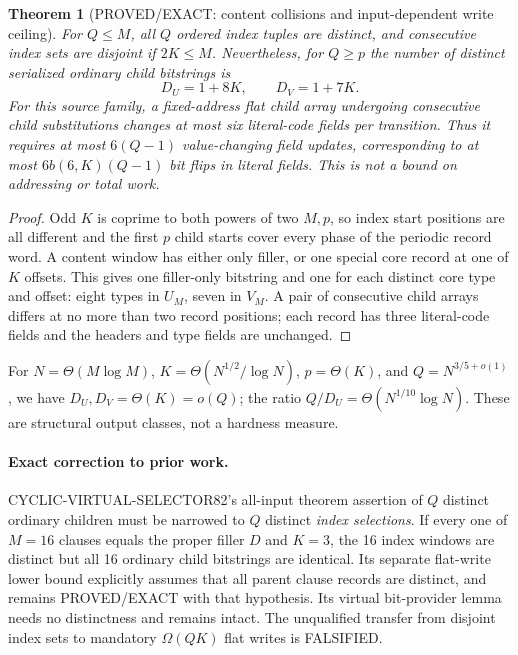 \documentclass[11pt]{article}
\newtheorem{theorem}{Theorem}
\begin{document}
\begin{theorem}[PROVED/EXACT: content collisions and input-dependent write ceiling]
For \(Q\le M\), all \(Q\) ordered index tuples are distinct, and consecutive index sets are disjoint if \(2K\le M\). Nevertheless, for \(Q\ge p\) the number of distinct \emph{serialized ordinary child bitstrings} is
\[
D_U=1+8K,\qquad D_V=1+7K.
\]
For this source family, a fixed-address flat child array undergoing consecutive child substitutions changes at most six literal-code fields per transition. Thus it requires at most \(6(Q-1)\) value-changing field updates, corresponding to at most \(6b(6,K)(Q-1)\) bit flips in literal fields. This is not a bound on addressing or total work.
\end{theorem}
\begin{proof}
Odd \(K\) is coprime to both powers of two \(M,p\), so index start positions are all different and the first \(p\) child starts cover every phase of the periodic record word. A content window has either only filler, or one special core record at one of \(K\) offsets. This gives one filler-only bitstring and one for each distinct core type and offset: eight types in \(U_M\), seven in \(V_M\). A pair of consecutive child arrays differs at no more than two record positions; each record has three literal-code fields and the headers and type fields are unchanged.
\end{proof}

For \(N=\Theta(M\log M)\), \(K=\Theta(N^{1/2}/\log N)\), \(p=\Theta(K)\), and \(Q=N^{3/5+o(1)}\), we have \(D_U,D_V=\Theta(K)=o(Q)\); the ratio \(Q/D_U=\Theta(N^{1/10}\log N)\). These are structural output classes, not a hardness measure.

\paragraph{Exact correction to prior work.}
CYCLIC-VIRTUAL-SELECTOR82's all-input theorem assertion of \(Q\) distinct ordinary children must be narrowed to \(Q\) distinct \emph{index selections}. If every one of \(M=16\) clauses equals the proper filler \(D\) and \(K=3\), the 16 index windows are distinct but all 16 ordinary child bitstrings are identical. Its separate flat-write lower bound explicitly assumes that all parent clause records are distinct, and remains PROVED/EXACT with that hypothesis. Its virtual bit-provider lemma needs no distinctness and remains intact. The unqualified transfer from disjoint index sets to mandatory \(\Omega(QK)\) flat writes is FALSIFIED.
\end{document}
